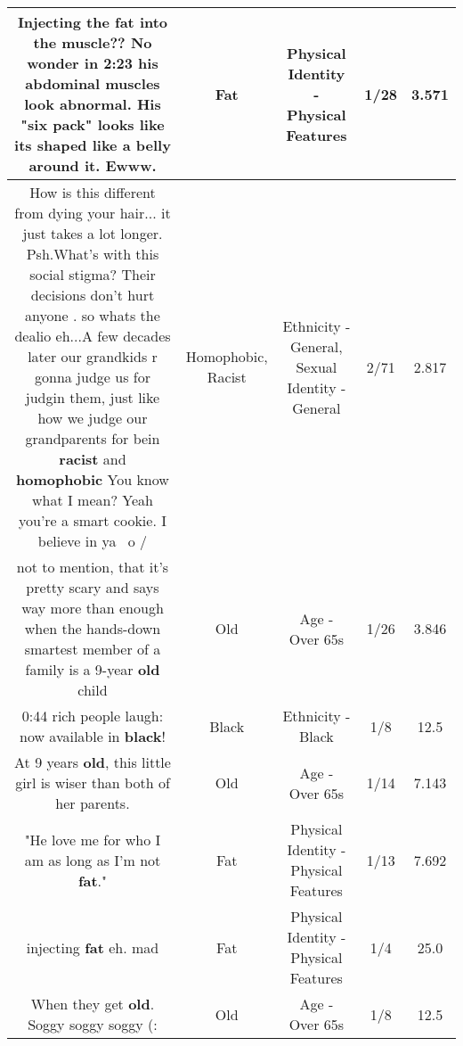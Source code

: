 \documentclass[11pt]{article}
\newlength\mylength
\begin{document}
\begin{center}
\begin{longtable}{|C{.65\mylength}|C{.30\mylength}|C{.12\mylength}|C{.12\mylength}|C{.12\mylength}|}
  \small Injecting the \textbf{fat} into the muscle?? No wonder in 2:23 his abdominal muscles look abnormal. His "six pack" looks like its shaped like a belly around it. Ewww.\normalsize   & Fat & Physical Identity - Physical Features & 1/28 & 3.571 \\  \hline
  \small How is this different from dying your hair... it just takes a lot longer. Psh.What's with this social stigma? Their decisions don't hurt anyone . so whats the dealio eh...A few decades later our grandkids r gonna judge us for judgin them, just like how we judge our grandparents for bein \textbf{racist} and \textbf{homophobic} You know what I mean? Yeah you're a smart cookie. I believe in ya \ o /\normalsize   & Homophobic, Racist & Ethnicity - General, Sexual Identity - General & 2/71 & 2.817 \\  \hline
  \small not to mention, that it's pretty scary and says way more than enough when the hands-down smartest member of a family is a 9-year \textbf{old} child\normalsize   & Old & Age - Over 65s & 1/26 & 3.846 \\  \hline
  \small 0:44 rich people laugh: now available in \textbf{black}!\normalsize   & Black & Ethnicity - Black & 1/8 & 12.5 \\  \hline
  \small At 9 years \textbf{old}, this little girl is wiser than both of her parents.\normalsize   & Old & Age - Over 65s & 1/14 & 7.143 \\  \hline
  \small "He love me for who I am as long as I'm not \textbf{fat}."\normalsize   & Fat & Physical Identity - Physical Features & 1/13 & 7.692 \\  \hline
  \small injecting \textbf{fat} eh. mad\normalsize   & Fat & Physical Identity - Physical Features & 1/4 & 25.0 \\  \hline
  \small When they get \textbf{old}. Soggy soggy soggy (:\normalsize   & Old & Age - Over 65s & 1/8 & 12.5 \\  \hline

\end{longtable}
\end{center}
\end{document}
